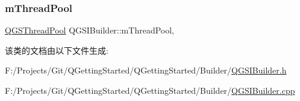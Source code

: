 \mbox{\label{class_q_g_s_i_builder_ad4d96f8deb3e6419b333eb228ec5e9f4}} 
\subsubsection{\texorpdfstring{m\+Thread\+Pool}{mThreadPool}}
{\footnotesize\ttfamily \mbox{\hyperlink{class_q_g_s_thread_pool}{Q\+G\+S\+Thread\+Pool}} Q\+G\+S\+I\+Builder\+::m\+Thread\+Pool\hspace{0.3cm}{\ttfamily [static]}, {\ttfamily [protected]}}



该类的文档由以下文件生成\+:\begin{DoxyCompactItemize}
\item 
F\+:/\+Projects/\+Git/\+Q\+Getting\+Started/\+Q\+Getting\+Started/\+Builder/\mbox{\hyperlink{_q_g_s_i_builder_8h}{Q\+G\+S\+I\+Builder.\+h}}\item 
F\+:/\+Projects/\+Git/\+Q\+Getting\+Started/\+Q\+Getting\+Started/\+Builder/\mbox{\hyperlink{_q_g_s_i_builder_8cpp}{Q\+G\+S\+I\+Builder.\+cpp}}\end{DoxyCompactItemize}
